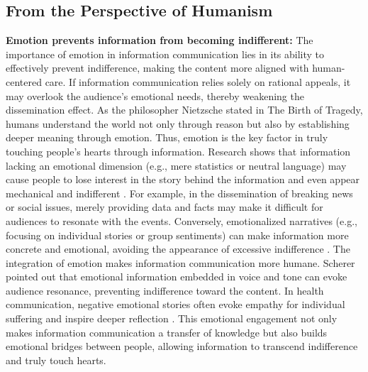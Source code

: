 \subsection{From the Perspective of Humanism} %
\textbf{Emotion prevents information from becoming indifferent:} The importance of emotion in information communication lies in its ability to effectively prevent indifference, making the content more aligned with human-centered care. If information communication relies solely on rational appeals, it may overlook the audience’s emotional needs, thereby weakening the dissemination effect. As the philosopher Nietzsche \cite{nietzsche2017birth} stated in The Birth of Tragedy, humans understand the world not only through reason but also by establishing deeper meaning through emotion. Thus, emotion is the key factor in truly touching people’s hearts through information. Research shows that information lacking an emotional dimension (e.g., mere statistics or neutral language) may cause people to lose interest in the story behind the information and even appear mechanical and indifferent \cite{dykas2011attachment, stieglitz2013emotions}. For example, in the dissemination of breaking news or social issues, merely providing data and facts may make it difficult for audiences to resonate with the events. Conversely, emotionalized narratives (e.g., focusing on individual stories or group sentiments) can make information more concrete and emotional, avoiding the appearance of excessive indifference \cite{van2020seeking}. The integration of emotion makes information communication more humane. Scherer \cite{scherer2003vocal} pointed out that emotional information embedded in voice and tone can evoke audience resonance, preventing indifference toward the content. In health communication, negative emotional stories often evoke empathy for individual suffering and inspire deeper reflection \cite{dubey2020psychosocial}. This emotional engagement not only makes information communication a transfer of knowledge but also builds emotional bridges between people, allowing information to transcend indifference and truly touch hearts.
